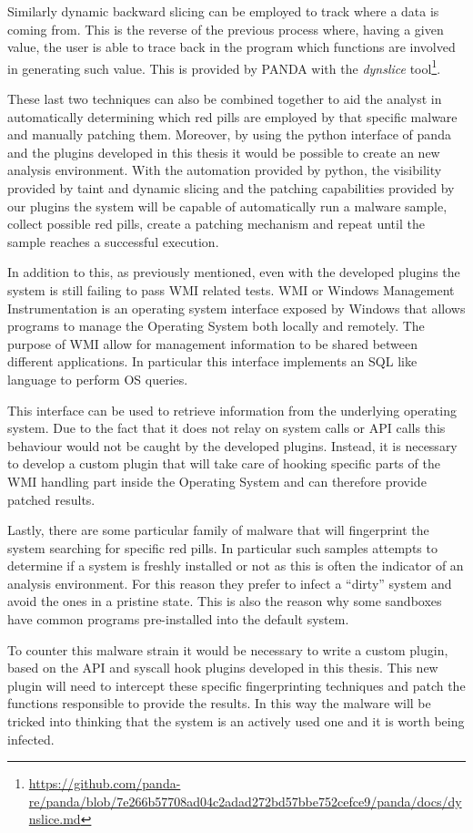 Similarly dynamic backward slicing can be employed to track where a data is coming from. This is the reverse of the previous process where, having a given value, the user is able to trace back in the program which functions are involved in generating such value. This is provided by PANDA with the \textit{dynslice} tool\footnote{\url{https://github.com/panda-re/panda/blob/7e266b57708ad04c2adad272bd57bbe752cefce9/panda/docs/dynslice.md}}.

These last two techniques can also be combined together to aid the analyst in automatically determining which red pills are employed by that specific malware and manually patching them. Moreover, by using the python interface of panda and the plugins developed in this thesis it would be possible to create an new analysis environment. With the automation provided by python, the visibility provided by taint and dynamic slicing and the patching capabilities provided by our plugins the system will be capable of automatically run a malware sample, collect possible red pills, create a patching mechanism and repeat until the sample reaches a successful execution.  

In addition to this, as previously mentioned, even with the developed plugins the system is still failing to pass WMI related tests. WMI or Windows Management Instrumentation is an operating system interface exposed by Windows that allows programs to manage the Operating System both locally and remotely. The purpose of WMI allow for management information to be shared between different applications. In particular this interface implements an SQL like language to perform OS queries.

This interface can be used to retrieve information from the underlying operating system. Due to the fact that it does not relay on system calls or API calls this behaviour would not be caught by the developed plugins. Instead, it is necessary to develop a custom plugin that will take care of hooking specific parts of the WMI handling part inside the Operating System and can therefore provide patched results. 


Lastly, there are some particular family of malware that will fingerprint the system searching for specific red pills. In particular such samples attempts to determine if a system is freshly installed or not as this is often the indicator of an analysis environment. For this reason they prefer to infect a ``dirty'' system and avoid the ones in a pristine state. This is also the reason why some sandboxes have common programs pre-installed into the default system.

To counter this malware strain it would be necessary to write a custom plugin, based on the API and syscall hook plugins developed in this thesis. This new plugin will need to intercept these specific fingerprinting techniques and patch the functions responsible to provide the results. In this way the malware will be tricked into thinking that the system is an actively used one and it is worth being infected. 